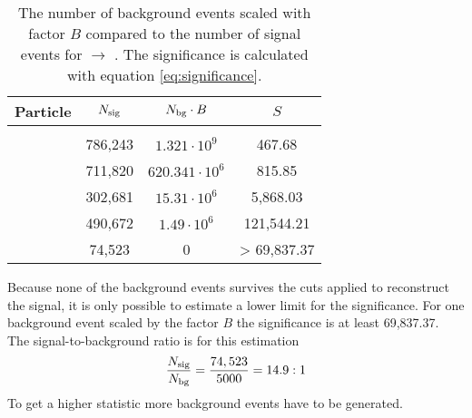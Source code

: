 \begin{table}
	\centering
	\caption{\propose The number of background events scaled with factor $B$ compared to the number of signal events for \pbarpSystem $\rightarrow$ \excitedcascade \anticascade.
		The significance is calculated with equation \ref{eq:significance}.}
	\label{bg_compared_reco_with_scaling}
	\begin{tabular}{lccc}
		\hline
		Particle & $N_{\textnormal{sig}}$ & $N_{\textnormal{bg}} \cdot B$ & $S$\\
		\hline
		\hline
		& & &\\
		\lam & 786,243 &$ 1.321 \cdot 10^{9}$& 467.68\\
		\alam & 711,820 & $620.341 \cdot 10^{6}$ & 815.85\\
		\anticascade & 302,681 & $15.31 \cdot 10^{6}$ & 5,868.03\\
		\excitedcascade &490,672  & $1.49 \cdot 10^{6}$& 121,544.21\\
		\excitedcascade \anticascade &  74,523 & 0 & > 69,837.37\\
		\hline
		 
		  
	\end{tabular}
\end{table}
Because none of the background events survives the cuts applied to reconstruct the signal, it is only possible to estimate a lower limit for the significance.
For one background event scaled by the factor $B$ the significance is at least 69,837.37.
The signal-to-background ratio is for this estimation
\begin{equation}
	\nonumber
	\frac{N_{\textnormal{sig}}}{N_{\textnormal{bg}}} = \frac{74,523} {5000} = 14.9 : 1
\end{equation}
To get a higher statistic more background events have to be generated.
	